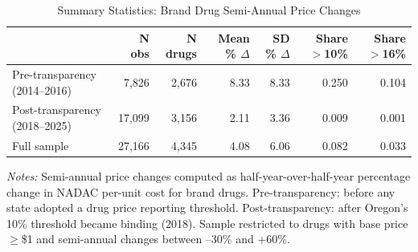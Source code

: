 \begin{table}[H]
\centering
\caption{Summary Statistics: Brand Drug Semi-Annual Price Changes}
\begin{threeparttable}
\footnotesize
\begin{tabular}{lrrrrrr}
\toprule
& N obs & N drugs & Mean \% $\Delta$ & SD \% $\Delta$ & Share $>$10\% & Share $>$16\% \\
\midrule
Pre-transparency (2014--2016) & 7,826 & 2,676 & 8.33 & 8.33 & 0.250 & 0.104 \\
Post-transparency (2018--2025) & 17,099 & 3,156 & 2.11 & 3.36 & 0.009 & 0.001 \\
\midrule
Full sample & 27,166 & 4,345 & 4.08 & 6.06 & 0.082 & 0.033 \\
\bottomrule
\end{tabular}
\begin{tablenotes}[flushleft]
\small
\item \textit{Notes:} Semi-annual price changes computed as half-year-over-half-year percentage change in NADAC per-unit cost for brand drugs. Pre-transparency: before any state adopted a drug price reporting threshold. Post-transparency: after Oregon's 10\% threshold became binding (2018). Sample restricted to drugs with base price $\geq$\$1 and semi-annual changes between --30\% and +60\%.
\end{tablenotes}
\end{threeparttable}
\label{tab:summary}
\end{table}
